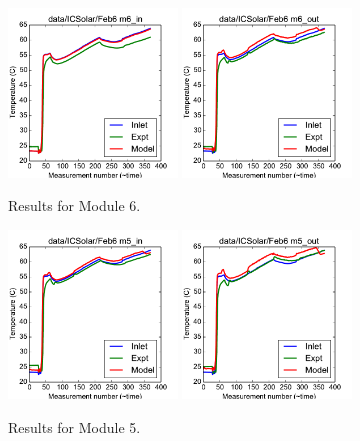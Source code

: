 \documentclass{article}
\begin{document}
\begin{figure}[!ht]
\centering
\includegraphics[width=0.4\textwidth]{../../data/ICSolar/images/Feb6_m6_in.pdf}\hspace{0.05\textwidth}
\includegraphics[width=0.4\textwidth]{../../data/ICSolar/images/Feb6_m6_out.pdf}\hspace{0.05\textwidth}\\
\caption{Results for Module 6.}\end{figure}
\begin{figure}[!ht]
\centering
\includegraphics[width=0.4\textwidth]{../../data/ICSolar/images/Feb6_m5_in.pdf}\hspace{0.05\textwidth}
\includegraphics[width=0.4\textwidth]{../../data/ICSolar/images/Feb6_m5_out.pdf}\hspace{0.05\textwidth}\\
\caption{Results for Module 5.}\end{figure}
\end{document}
